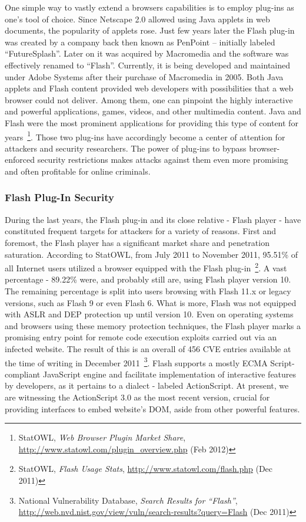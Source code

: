       One simple way to vastly extend a browsers capabilities is to employ plug-ins as one's tool of choice. Since Netscape 2.0 allowed using Java applets in web documents, the popularity of applets rose. Just few years later the Flash plug-in was created by a company back then known as PenPoint -- initially labeled ``FutureSplash''. Later on it was acquired by Macromedia and the software was effectively renamed to ``Flash''. Currently, it is being developed and maintained under Adobe Systems after their purchase of Macromedia in 2005. Both Java applets and Flash content provided web developers with possibilities that a web browser could not deliver. Among them, one can pinpoint the highly interactive and powerful applications, games, videos, and other multimedia content. Java and Flash were the most prominent applications for providing this type of content for years~\footnote{StatOWL, \textit{Web Browser Plugin Market Share}, \url{http://www.statowl.com/plugin_overview.php} (Feb 2012)}. Those two plug-ins 
have accordingly become a center of attention for attackers and security researchers. The power of plug-ins to bypass browser-enforced security restrictions makes attacks against them even more promising and often profitable for online criminals.

      \subsubsection{Flash Plug-In Security}
      \label{subsubsubsec:2.4.3.1.flash_plugin_security}

      During the last years, the Flash plug-in and its close relative -  Flash player -  have constituted frequent targets for attackers for a variety of reasons. First and foremost, the Flash player has a significant market share and penetration saturation. According to StatOWL, from July 2011 to November 2011, 95.51\% of all Internet users utilized a browser equipped with the Flash plug-in~\footnote{StatOWL, \textit{Flash Usage Stats}, \url{http://www.statowl.com/flash.php} (Dec 2011)}. A vast percentage - 89.22\% were, and probably still are, using Flash player version 10. The remaining percentage is split into users browsing with Flash 11.x or legacy versions, such as Flash 9 or even Flash 6. What is more, Flash was not equipped with ASLR and DEP protection up until version 10. Even on operating systems and browsers using these memory protection techniques, the Flash player marks a promising entry point for remote code execution exploits carried out via an infected website. The result of this is an 
overall of 456 CVE entries available at the time of writing in December 2011~\footnote{National Vulnerability Database, \textit{Search Results for ``Flash''}, \url{http://web.nvd.nist.gov/view/vuln/search-results?query=Flash} (Dec 2011)}. Flash supports a mostly ECMA Script-compliant JavaScript engine and facilitate implementation of interactive features by developers, as it pertains to a dialect - labeled ActionScript. At present, we are witnessing the ActionScript 3.0 as the most recent version, crucial for providing interfaces to embed website's DOM, aside from other powerful features.\\

